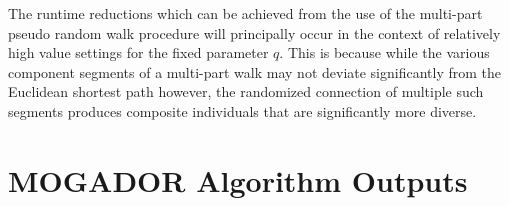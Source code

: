 The runtime reductions which can be achieved from the use of the multi-part pseudo random walk procedure will principally occur in the context of relatively high value settings for the fixed parameter $q$. This is because while the various component segments of a multi-part walk may not deviate significantly from the Euclidean shortest path however, the randomized connection of multiple such segments produces composite individuals that are significantly more diverse.
            
\section{MOGADOR Algorithm Outputs}
